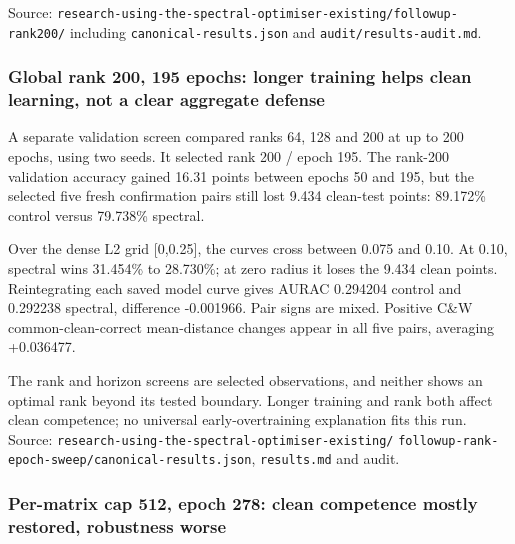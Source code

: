\documentclass[
  british,
  10pt,
  a4paper,
]{article}
\begin{document}
Source:
\texttt{research-\allowbreak{}using-\allowbreak{}the-\allowbreak{}spectral-\allowbreak{}optimiser-\allowbreak{}existing/\allowbreak{}followup-\allowbreak{}rank200/\allowbreak{}}
including \texttt{canonical-\allowbreak{}results.\allowbreak{}json} and
\texttt{audit/\allowbreak{}results-\allowbreak{}audit.\allowbreak{}md}.

\subsubsection{Global rank 200, 195 epochs: longer training helps clean
learning, not a clear aggregate
defense}\label{external-studies--global-rank-200-195-epochs-longer-training-helps-clean-learning-not-a-clear-aggregate-defense}

A separate validation screen compared ranks 64, 128 and 200 at up to 200
epochs, using two seeds. It selected rank 200 / epoch 195. The rank-200
validation accuracy gained 16.31 points between epochs 50 and 195, but
the selected five fresh confirmation pairs still lost 9.434 clean-test
points: 89.172\% control versus 79.738\% spectral.

Over the dense L2 grid {[}0,0.25{]}, the curves cross between 0.075 and
0.10. At 0.10, spectral wins 31.454\% to 28.730\%; at zero radius it
loses the 9.434 clean points. Reintegrating each saved model curve gives
AURAC 0.294204 control and 0.292238 spectral, difference -0.001966. Pair
signs are mixed. Positive C\&W
common-\allowbreak{}clean-\allowbreak{}correct
mean-\allowbreak{}distance changes appear in all five pairs, averaging
+0.036477.

The rank and horizon screens are selected
observations\allowbreak{},\allowbreak{} and neither shows an optimal
rank beyond its tested boundary. Longer training and rank both affect
clean competence; no universal
early-\allowbreak{}overtraining\allowbreak{} explanation fits this run.
Source:
\texttt{research-\allowbreak{}using-\allowbreak{}the-\allowbreak{}spectral-\allowbreak{}optimiser-\allowbreak{}existing/\allowbreak{}}
\texttt{followup-\allowbreak{}rank-\allowbreak{}epoch-\allowbreak{}sweep/\allowbreak{}canonical-\allowbreak{}results.\allowbreak{}json},
\texttt{results.md} and audit.

\subsubsection{Per-matrix cap 512, epoch 278: clean competence mostly
restored, robustness
worse}\label{external-studies--per-matrix-cap-512-epoch-278-clean-competence-mostly-restored-robustness-worse}
\end{document}
